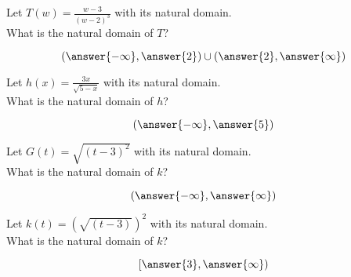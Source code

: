 \documentclass{ximera}
\author{Lee Wayand}
\begin{document}
\begin{exercise}








\begin{question}


Let $T(w) = \frac{w-3}{(w-2)^3}$ with its natural domain. \\

What is the natural domain of $T$?

\[
\left( \answer{-\infty}, \answer{2} \right) \cup \left( \answer{2}, \answer{\infty}  \right)
\]


\end{question}







\begin{question}


Let $h(x) = \frac{3x}{\sqrt{5-x}}$ with its natural domain. \\

What is the natural domain of $h$?

\[
\left( \answer{-\infty}, \answer{5}  \right)
\]


\end{question}








\begin{question}


Let $G(t) = \sqrt{(t - 3)^2}$ with its natural domain. \\

What is the natural domain of $k$?

\[
\left( \answer{-\infty}, \answer{\infty}  \right)
\]


\end{question}













\begin{question}


Let $k(t) = \left( \sqrt{(t - 3)} \right)^2$ with its natural domain. \\

What is the natural domain of $k$?

\[
\left[ \answer{3}, \answer{\infty}  \right)
\]


\end{question}




















\end{exercise}
\end{document}
